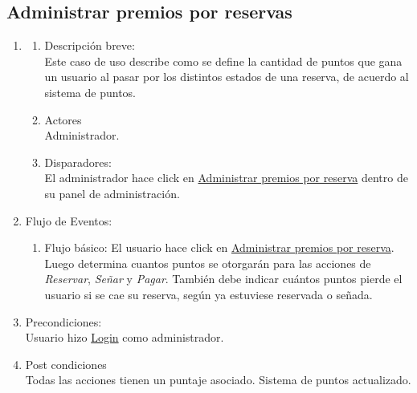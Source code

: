 \documentclass[a4paper,11pt]{article}
\begin{document}

\subsection{Administrar premios por reservas}
\begin{enumerate}

    \item
    \begin{enumerate}
    \item Descripción breve: \\
        Este caso de uso describe como se define la cantidad de puntos que gana
        un usuario al pasar por los distintos estados de una reserva, de acuerdo
        al sistema de puntos.
    \item Actores \\
        Administrador.
    \item Disparadores: \\
        El administrador hace click en \underline{Administrar premios por reserva}
        dentro de su panel de administración.
    \end{enumerate}

    \item Flujo de Eventos: 

    \begin{enumerate}

        \item Flujo básico:
            El usuario hace click en \underline{Administrar premios por reserva}.
            Luego determina cuantos puntos se otorgarán para las acciones de
            \textit{Reservar}, \textit{Señar} y \textit{Pagar}.
            También debe indicar cuántos puntos pierde el usuario si se cae
            su reserva, según ya estuviese reservada o señada.
    \end{enumerate}

    \item Precondiciones: \\
        Usuario hizo \underline{Login} como administrador.

    \item Post condiciones \\
        Todas las acciones tienen un puntaje asociado. Sistema de puntos
        actualizado.

\end{enumerate}

\end{document}
